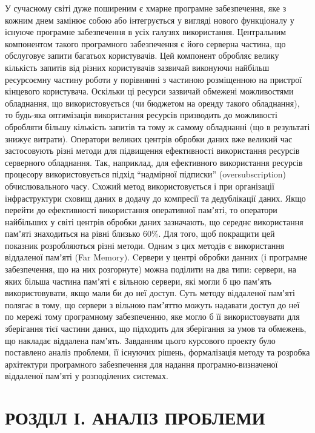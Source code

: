 \documentclass[14pt]{article}
\begin{document}
    У сучасному світі дуже поширеним є хмарне програмне забезпечення, яке з кожним днем замінює собою або інтегрується у вигляді нового функціоналу у існуюче програмне забезпечення в усіх галузях використання. Центральним компонентом такого програмного забезпечення є його серверна частина, що обслуговує запити багатьох користувачів. Цей компонент обробляє велику кількість запитів від різних користувачів зазвичай виконуючи найбільш ресурсоємну частину роботи у порівнянні з частиною розміщенною на пристрої кінцевого користувача. Оскільки ці ресурси зазвичай обмежені можливостями обладнання, що використовується (чи бюджетом на оренду такого обладнання), то будь-яка оптимізація використання ресурсів призводить до можливості обробляти більшу кількість запитів та тому ж самому обладнанні (що в результаті знижує витрати). 
    Оператори великих центрів обробки даних вже великий час застосовують різні методи для підвищення ефективності використання ресурсів серверного обладнання. Так, наприклад, для ефективного використання ресурсів процесору використовується підхід “надмірної підписки” (oversubscription) обчислювального часу. Схожий метод використовується і при організації інфраструктури сховищ даних в додачу до компресії та дедублікації даних.
Якщо перейти до ефективності використання оперативної памʼяті, то оператори найбільших у світі центрів обробки даних зазначають, що середнє використання памʼяті знаходиться на рівні близько 60\%. Для того, щоб покращити цей показник розробляються різні методи. Одним з цих методів є використання віддаленої памʼяті (Far Memory).
Cервери у центрі обробки данних (і програмне забезпечення, що на них розгорнуте) можна поділити на два типи: 
сервери, на яких більша частина памʼяті є вільною
сервери, які могли б цю памʼять використовувати, якщо мали би до неї доступ. 
    Суть методу віддаленої памʼяті полягає в тому, що сервери з вільною памʼяттю можуть надавати доступ до неї по мережі тому програмному забезпеченню, яке могло б її використовувати для зберігання тієї частини даних, що підходить для зберігання за умов та обмежень, що накладає віддалена памʼять.
    Завданням цього курсового проекту було поставлено аналіз проблеми, її існуючих рішень, формалізація методу та розробка архітектури програмного забезпечення для надання програмно-визначеної віддаленої памʼяті у розподілених системах.

\pagebreak

\chapter{РОЗДІЛ І. АНАЛІЗ ПРОБЛЕМИ}
\end{document}
